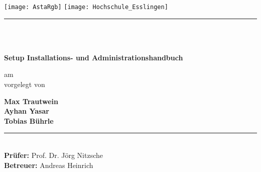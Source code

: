 \newcommand{\HRule}[2]{\noindent\rule[#1]{\linewidth}{#2}}
\newcommand{\vlinespace}[1]{\vspace*{#1\baselineskip}}
\newcommand{\titleemph}[1]{\textbf{#1}}
\begin{titlepage}
    \sffamily
    \texttt{[image: AstaRgb]}
    \hfill
    \texttt{[image: Hochschule\_Esslingen]}
    \HRule{13pt}{1pt}
    \centering
    \vlinespace{3}\\
    \workTyp\\
    \begin{Large}
        \textbf{Setup Installations- und Administrationshandbuch}\\
    \end{Large}
    \vlinespace{4}
    am \workDatum\\
    \vlinespace{4}
    vorgelegt von\\
    \begin{Large}
        \textbf{Max Trautwein}\\
        \textbf{Ayhan Yasar}\\
        \textbf{Tobias Bührle}\\
    \end{Large}
    \vlinespace{1}
    \vfill
    \raggedright{}
    \HRule{13pt}{1pt} \\
    \titleemph{Prüfer:} Prof. Dr. Jörg Nitzsche\\
    \titleemph{Betreuer:} Andreas Heinrich\\
\end{titlepage}

